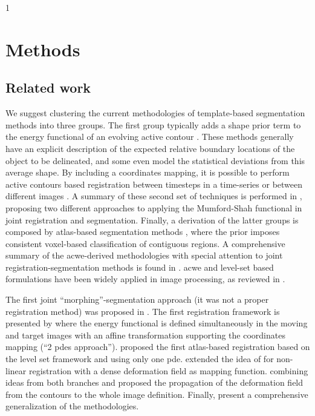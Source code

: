 1\section{Methods}
\label{sec:methods}
%
\subsection{Related work}
\label{sec:methods_background}

We suggest clustering the 
current methodologies of template-based segmentation methods into three groups. 
The first group typically adds a shape prior term to the energy functional of 
an evolving active contour \citep{bresson_variational_2006,
chan_level_2005,chen_using_2002,cremers_kernel_2006,gastaud_combining_2004}.
These methods generally have an explicit description of the expected relative boundary 
locations of the object to be delineated, and some even model the statistical deviations
from this average shape. By including a coordinates mapping, it is possible to perform
active contours based registration between timesteps in a time-series or between different
images \citep{bertalmio_morphing_2000,wyatt_map_2003,paragios_level_2003,vemuri_joint_2003,
yezzi_variational_2003}.
A summary of these second set of techniques is performed in \citep{droske_mumfordshah_2009},
proposing two different approaches to applying the Mumford-Shah \citep{mumford_optimal_1989}
functional in joint registration and segmentation. Finally, a derivation of the 
latter groups is composed by atlas-based segmentation methods 
\citep{gorthi_segmentation_2009,gorthi_active_2011,pohl_unifying_2005,
pohl_bayesian_2006,wang_joint_2006}, where the prior 
imposes consistent voxel-based classification of contiguous regions.
A comprehensive summary of the \gls{acwe}-derived methodologies with special attention
to joint registration-segmentation methods is found in \citep{gorthi_active_2011}.
\Gls{acwe} and level-set based formulations have been widely applied in image
processing, as reviewed in \citep{suri_shape_2002}.

The first joint ``morphing''-segmentation approach (it was not a proper
registration method) was proposed in \citep{bertalmio_morphing_2000}. The first
registration framework is presented by \citep{yezzi_variational_2001} where the
energy functional is defined simultaneously in the moving and target images with
an affine transformation supporting the coordinates mapping (``2 \glspl*{pde} approach'').
\citep{vemuri_joint_2003} proposed the first atlas-based registration based on the 
level set framework and using only one \gls*{pde}. \citep{unal_coupled_2005} extended the 
idea of \citep{bertalmio_morphing_2000,yezzi_variational_2001} for non-linear 
registration with a dense deformation field as mapping function. \citep{droske_mumfordshah_2009}
combining ideas from both branches and proposed the propagation of the 
deformation field from the contours to the whole image definition. Finally,
\citep{gorthi_active_2011} present a comprehensive generalization of the methodologies.

